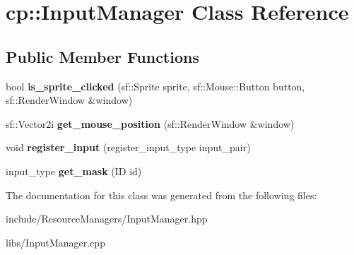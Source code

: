 \hypertarget{classcp_1_1_input_manager}{}\section{cp\+:\+:Input\+Manager Class Reference}
\label{classcp_1_1_input_manager}
\subsection*{Public Member Functions}
\begin{DoxyCompactItemize}
\item 
\mbox{\label{classcp_1_1_input_manager_add39dcc53f2dd57e84a698fb79bcc52d}} 
bool {\bfseries is\+\_\+sprite\+\_\+clicked} (sf\+::\+Sprite sprite, sf\+::\+Mouse\+::\+Button button, sf\+::\+Render\+Window \&window)
\item 
\mbox{\label{classcp_1_1_input_manager_a2b44b7f5ba80f2c09021f939454c2e8d}} 
sf\+::\+Vector2i {\bfseries get\+\_\+mouse\+\_\+position} (sf\+::\+Render\+Window \&window)
\item 
\mbox{\label{classcp_1_1_input_manager_a2a3a288ebce452b2fbe2284c679ee815}} 
void {\bfseries register\+\_\+input} (register\+\_\+input\+\_\+type input\+\_\+pair)
\item 
\mbox{\label{classcp_1_1_input_manager_a25d2dbeef1b4444ea328ff9df945c983}} 
input\+\_\+type {\bfseries get\+\_\+mask} (ID id)
\end{DoxyCompactItemize}


The documentation for this class was generated from the following files\+:\begin{DoxyCompactItemize}
\item 
include/\+Resource\+Managers/Input\+Manager.\+hpp\item 
libs/Input\+Manager.\+cpp\end{DoxyCompactItemize}
